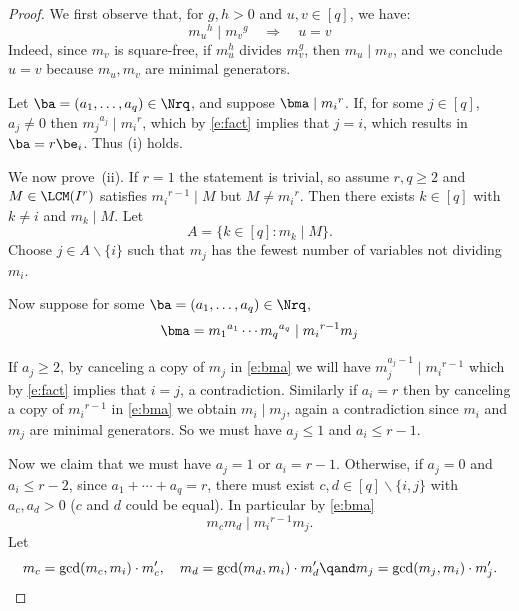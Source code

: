   \begin{proof} We first observe that, for $g,h>0$ and $u,v\in [q]$, we have:
    \begin{equation}\label{e:fact}
                {m_u}^{h} \mid {m_v}^{g}\quad   \Longrightarrow  \quad u=v 
    \end{equation}
Indeed, since $m_v$ is square-free, if $m_u^{h}$ divides $m_v^g$, then  $m_u\mid m_v$, and we conclude $u=v$ because $m_u, m_v$ are minimal generators. 
    
  Let $\ba=(a_1,\ldots,a_q) \in \Nrq$, and suppose $\bma \mid
  {m_i}^r$. If, for some $j \in [q]$, $a_j \neq 0$ then ${m_j}^{a_j}
  \mid {m_i}^r$, which by \eqref{e:fact} implies that $j=i$, which
  results in $\ba=r\be_i$. Thus \textup{(}i\textup{)} holds.

  We now prove~\textup{(}ii\textup{)}. If $r=1$ the statement is trivial, so assume $r, q \geq 2$ and $M \in \LCM(I^r)$
  satisfies ${m_i}^{r-1}\mid M$ but $M \neq {m_i}^r$. Then there
  exists $k\in [q]$ with $k \neq i$ and $m_k \mid M$. Let $$A=\{k\in
  [q]\colon m_k\mid M\}.$$ Choose $j \in A \smallsetminus\{i\}$ such that $m_j$
  has the fewest number of variables not dividing $m_i$. 

  Now suppose for some $\ba=(a_1,\ldots,a_q) \in \Nrq$,
  \begin{equation}\label{e:bma}
    \bma={m_1}^{a_1}\cdots {m_q}^{a_q} \mid {m_i}^{r-1}m_j
  \end{equation}

  If $a_j \geq 2$, by canceling a copy of $m_j$ in \eqref{e:bma} we
  will have $m_j^{a_j-1} \mid {m_i}^{r-1}$ which by \eqref{e:fact}
  implies that $i=j$, a contradiction.  Similarly if $a_i = r$ then
  by canceling a copy of ${m_i}^{r-1}$ in \eqref{e:bma} we obtain
  $m_i \mid m_j$, again a contradiction since $m_i$ and $m_j$ are minimal generators.
  So we must have $a_j \leq 1$ and $a_i \leq r-1$.

  Now we claim that we must have $a_j=1$ or $a_i=r-1$. Otherwise, if
  $a_j=0$ and $a_i \leq r-2$, since $a_1+\cdots + a_q=r$, there must exist $c,d\in
  [q]\smallsetminus\{i,j\}$ with $a_c,a_d>0$ \textup{(}$c$ and $d$ could be equal\textup{)}. In particular by \eqref{e:bma}
\begin{equation}\label{e:cd}
m_cm_d \mid {m_i}^{r-1}m_j.
\end{equation}
Let 
\begin{equation}\label{e:cj}
  m_c=\gcd(m_c,m_i) \cdot m_c', \quad
  m_d=\gcd(m_d,m_i) \cdot m_d' \qand
  m_j=\gcd(m_j,m_i) \cdot m_j'.
\end{equation}


\end{proof}
